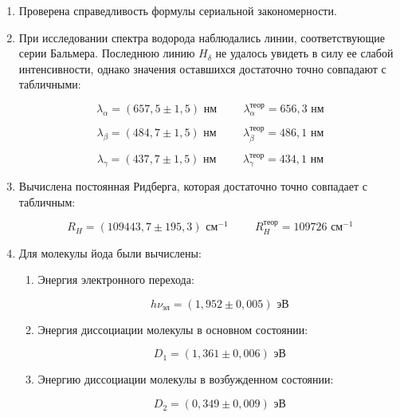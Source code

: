 \documentclass[a4paper, 12pt]{article}%
\begin{document}
\begin{enumerate}
	
	\item Проверена справедливость формулы сериальной закономерности.
	
	\item При исследовании спектра водорода наблюдались линии,  соответствующие серии Бальмера.  Последнюю линию $H_{\delta}$ не удалось увидеть в силу ее слабой интенсивности,  однако значения оставшихся достаточно точно совпадают с табличными:
	
		\[\lambda_{\alpha} =  (657,5 \pm 1,5) \text{ нм} \hspace{1cm} \lambda_{\alpha}^{\text{теор}} = 656,3 \text{ нм}\]
		
		\[\lambda_{\beta}=  (484,7 \pm 1,5) \text{ нм} \hspace{1cm} \lambda_{\beta}^{\text{теор}} = 486,1 \text{ нм}\]
			
		\[\lambda_{\gamma} =  (437,7 \pm 1,5) \text{ нм} \hspace{1cm} \lambda_{\gamma}^{\text{теор}} = 434,1 \text{ нм}\]	
					
	\item Вычислена постоянная Ридберга,  которая достаточно точно совпадает с табличным:
	
		\[R_H = (109443,7 \pm 195,3) \text{ см}^{-1} \hspace{1cm} R_H^{\text{теор}} = 109726 \text{ см}^{-1}\]
	
	\item Для молекулы йода были вычислены:
	
		\begin{enumerate}
		
			\item Энергия электронного перехода:
			
				\[h \nu_{\text{эл}} = (1,952 \pm 0,005) \text{ эВ}\]
			
			\item Энергия диссоциации молекулы в основном состоянии:
			
				 \[D_1 = (1,361 \pm 0,006) \text{ эВ}\]
			
			\item Энергию диссоциации молекулы в возбужденном состоянии:	
			
				\[D_2 = (0,349 \pm 0,009) \text{ эВ}\]
		
		\end{enumerate}
		    
\end{enumerate}
\end{document}
